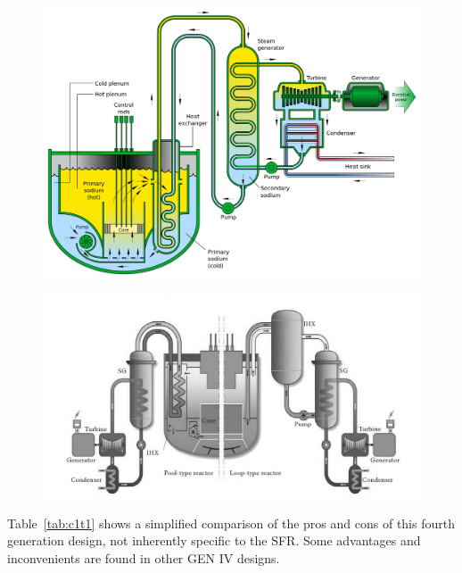 \begin{figure}[t!]
	\centering
	\includegraphics[height=0.5\textheight]{fig01/Sodium-Cooled_Fast_Reactor_Schemata}
	\label{fig:c1f1}
\end{figure}

\begin{figure}[t!]
	\centering
	\includegraphics[height=0.4\textheight]{fig01/SFR_pool_loop_types}
	\label{fig:c1f2}
\end{figure}

Table~\ref{tab:c1t1} shows a simplified comparison of the pros and cons of this fourth generation design, not inherently specific to the SFR. Some advantages and inconvenients are found in other GEN IV designs.


